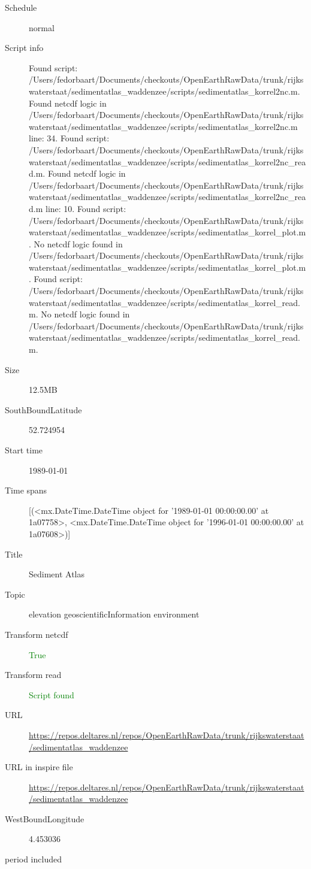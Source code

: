 \documentclass[9]{report}
\begin{document}
\begin{description}
\begin{verbatim}
\end{verbatim}
  \item[Schedule] normal
  \item[Script info] Found script: /Users/fedorbaart/Documents/checkouts/OpenEarthRawData/trunk/rijkswaterstaat/sedimentatlas\_waddenzee/scripts/sedimentatlas\_korrel2nc.m.
Found netcdf logic in /Users/fedorbaart/Documents/checkouts/OpenEarthRawData/trunk/rijkswaterstaat/sedimentatlas\_waddenzee/scripts/sedimentatlas\_korrel2nc.m line: 34.
Found script: /Users/fedorbaart/Documents/checkouts/OpenEarthRawData/trunk/rijkswaterstaat/sedimentatlas\_waddenzee/scripts/sedimentatlas\_korrel2nc\_read.m.
Found netcdf logic in /Users/fedorbaart/Documents/checkouts/OpenEarthRawData/trunk/rijkswaterstaat/sedimentatlas\_waddenzee/scripts/sedimentatlas\_korrel2nc\_read.m line: 10.
Found script: /Users/fedorbaart/Documents/checkouts/OpenEarthRawData/trunk/rijkswaterstaat/sedimentatlas\_waddenzee/scripts/sedimentatlas\_korrel\_plot.m.
No netcdf logic found in /Users/fedorbaart/Documents/checkouts/OpenEarthRawData/trunk/rijkswaterstaat/sedimentatlas\_waddenzee/scripts/sedimentatlas\_korrel\_plot.m.
Found script: /Users/fedorbaart/Documents/checkouts/OpenEarthRawData/trunk/rijkswaterstaat/sedimentatlas\_waddenzee/scripts/sedimentatlas\_korrel\_read.m.
No netcdf logic found in /Users/fedorbaart/Documents/checkouts/OpenEarthRawData/trunk/rijkswaterstaat/sedimentatlas\_waddenzee/scripts/sedimentatlas\_korrel\_read.m.
  \item[Size] 12.5MB
  \item[SouthBoundLatitude] 52.724954
  \item[Start time] 1989-01-01
  \item[Time spans] [(<mx.DateTime.DateTime object for '1989-01-01 00:00:00.00' at 1a07758>, <mx.DateTime.DateTime object for '1996-01-01 00:00:00.00' at 1a07608>)]
  \item[Title]  Sediment Atlas 
  \item[Topic] elevation geoscientificInformation environment
  \item[Transform netcdf] \textcolor{green}{True}
  \item[Transform read] \textcolor{green}{Script found}
  \item[URL] \href{https://repos.deltares.nl/repos/OpenEarthRawData/trunk/rijkswaterstaat/sedimentatlas\_waddenzee}{https://repos.deltares.nl/repos/OpenEarthRawData/trunk/rijkswaterstaat/sedimentatlas\_waddenzee}
  \item[URL in inspire file] \href{https://repos.deltares.nl/repos/OpenEarthRawData/trunk/rijkswaterstaat/sedimentatlas\_waddenzee}{https://repos.deltares.nl/repos/OpenEarthRawData/trunk/rijkswaterstaat/sedimentatlas\_waddenzee}
  \item[WestBoundLongitude] 4.453036
  \item[period included] 
\end{description}
\end{document}
